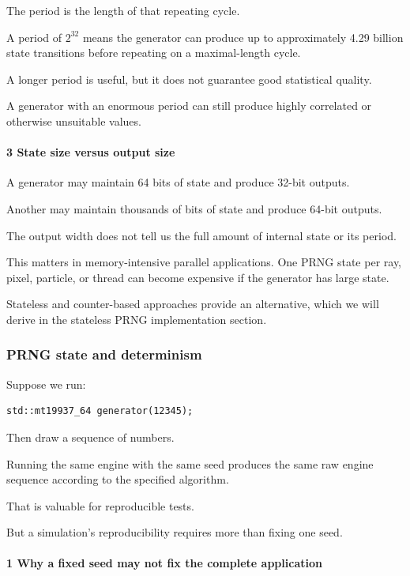 The period is the length of that repeating cycle.

A period of \(2^{32}\) means the generator can produce up to approximately 4.29 billion state transitions before repeating on a maximal-length cycle.

A longer period is useful, but it does not guarantee good statistical quality.

A generator with an enormous period can still produce highly correlated or otherwise unsuitable values.

\paragraph{3 State size versus output size}\label{state-size-versus-output-size}

A generator may maintain 64 bits of state and produce 32-bit outputs.

Another may maintain thousands of bits of state and produce 64-bit outputs.

The output width does not tell us the full amount of internal state or its period.

This matters in memory-intensive parallel applications. One PRNG state per ray, pixel, particle, or thread can become expensive if the generator has large state.

Stateless and counter-based approaches provide an alternative, which we will derive in the stateless PRNG implementation section.

\subsubsection{PRNG state and determinism}\label{prng-state-and-determinism}

Suppose we run:

\begin{verbatim}
std::mt19937_64 generator(12345);
\end{verbatim}

Then draw a sequence of numbers.

Running the same engine with the same seed produces the same raw engine sequence according to the specified algorithm.

That is valuable for reproducible tests.

But a simulation's reproducibility requires more than fixing one seed.

\paragraph{1 Why a fixed seed may not fix the complete application}\label{why-a-fixed-seed-may-not-fix-the-complete-application}

